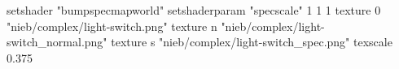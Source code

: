 setshader "bumpspecmapworld"
setshaderparam "specscale" 1 1 1
    texture 0 "nieb/complex/light-switch.png"
    texture n "nieb/complex/light-switch_normal.png"
    texture s "nieb/complex/light-switch_spec.png"
    texscale 0.375